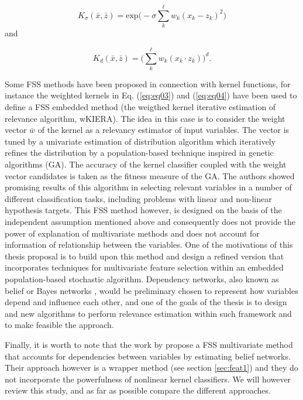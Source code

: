 \begin{equation}
	K_{\sigma}(\bar{x},\bar{z}) = \text{exp}\Big( -\sigma \sum_{k}^{\ell} w_k(x_k-z_k)^2 \Big)
	\label{eq:eq03}
\end{equation} and

\begin{equation}
	K_{d}(\bar{x},\bar{z}) = \Big( \sum_{k}^{\ell} w_k(x_k \cdot z_k) \Big)^d.
	\label{eq:eq04}
\end{equation}

Some FSS methods have been proposed in connection with kernel functions, for instance the weighted kernels in Eq. (\ref{eq:eq03}) and (\ref{eq:eq04}) have been used to define a FSS embedded method (the weigthed kernel iterative estimation of relevance algorithm, wKIERA\cite{rojas08}).  The idea in this case is to consider the weight vector \(\bar{w}\) of the kernel as a relevancy estimator of input variables. The vector is tuned by a univariate estimation of distribution algorithm \cite{larranaga01} which iteratively refines the distribution by a population-based technique inspired in genetic algorithms (GA)\cite{goldberg89}. The accuracy of the kernel classifier coupled with the weight vector candidates is taken as the fitness measure of the GA.  The authors showed promising results of this algorithm in selecting relevant variables in a number of different classification tasks, including problems with linear and non-linear hypothesis targets. This FSS method however, is designed on the basis of the independent assumption mentioned above and consequently does not provide the power of explanation of multivariate methods and does not account for information of relationship between the variables. One of the motivations of this thesis proposal is to build upon this method and design a refined version that incorporates techniques for multivariate feature selection within an embedded population-based stochastic algorithm. Dependency networks, also known as belief or Bayes networks \cite{heckerman99}, would be preliminary chosen to represent how variables depend and influence each other, and one of the goals of the thesis is to design and new algorithms to perform relevance estimation within such framework and to make feasible the approach. 

Finally, it is worth to note that the work by \cite{larranaga00FSS} propose a FSS multivariate method that accounts for dependencies between variables by estimating belief networks. Their approach however is a wrapper method (see section \ref{sec:feat1}) and they do not incorporate the powerfulness of nonlinear kernel classifiers. We will however review this study, and as far as possible compare the different approaches.

